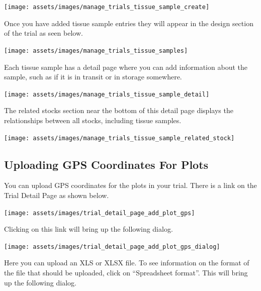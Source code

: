 \documentclass[
  12pt,
]{book}
\begin{document}
\begin{center}\texttt{[image: assets/images/manage\_trials\_tissue\_sample\_create]} \end{center}

Once you have added tissue sample entries they will appear in the design section of the trial as seen below.

\begin{center}\texttt{[image: assets/images/manage\_trials\_tissue\_samples]} \end{center}

Each tissue sample has a detail page where you can add information about the sample, such as if it is in transit or in storage somewhere.

\begin{center}\texttt{[image: assets/images/manage\_trials\_tissue\_sample\_detail]} \end{center}

The related stocks section near the bottom of this detail page displays the relationships between all stocks, including tissue samples.

\begin{center}\texttt{[image: assets/images/manage\_trials\_tissue\_sample\_related\_stock]} \end{center}

\hypertarget{uploading-gps-coordinates-for-plots}{%
\subsection{Uploading GPS Coordinates For Plots}\label{uploading-gps-coordinates-for-plots}}

You can upload GPS coordinates for the plots in your trial. There is a link on the Trial Detail Page as shown below.

\begin{center}\texttt{[image: assets/images/trial\_detail\_page\_add\_plot\_gps]} \end{center}

Clicking on this link will bring up the following dialog.

\begin{center}\texttt{[image: assets/images/trial\_detail\_page\_add\_plot\_gps\_dialog]} \end{center}

Here you can upload an XLS or XLSX file. To see information on the format of the file that should be uploaded, click on ``Spreadsheet format''. This will bring up the following dialog.
\end{document}

